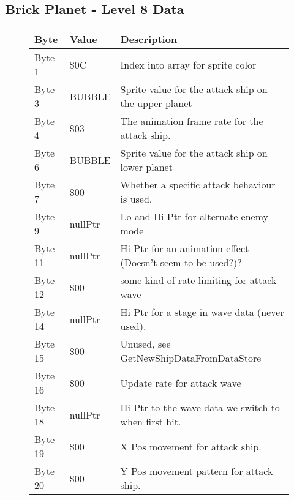 \clearpage
\subsection{Brick Planet - Level 8 Data}

\begin{figure}[H]
  {
  \setlength{\tabcolsep}{3.0pt}
  \setlength\cmidrulewidth{\heavyrulewidth} %
  \begin{adjustbox}{width=12cm}

\begin{tabular}{lll}
\toprule
 Byte    & Value            & Description                                                        \\
\midrule
 Byte 1  & \$0C              & Index into array for sprite color                                  \\
 Byte 3  & BUBBLE           & Sprite value for the attack ship on the upper planet               \\
 Byte 4  & \$03              & The animation frame rate for the attack ship.                      \\
 Byte 6  & BUBBLE           & Sprite value for the attack ship on lower planet                   \\
 Byte 7  & \$00              & Whether a specific attack behaviour is used.                       \\
 Byte 9  & nullPtr          & Lo and Hi Ptr for alternate enemy mode                             \\
 Byte 11 & nullPtr          & Hi Ptr for an animation effect (Doesn't seem to be used?)?         \\
 Byte 12 & \$00              & some kind of rate limiting for attack wave                         \\
 Byte 14 & nullPtr          & Hi Ptr for a stage in wave data (never used).                      \\
 Byte 15 & \$00              & Unused, see GetNewShipDataFromDataStore                            \\
 Byte 16 & \$00              & Update rate for attack wave                                        \\
 Byte 18 & nullPtr          & Hi Ptr to the wave data we switch to when first hit.               \\
 Byte 19 & \$00              & X Pos movement for attack ship.                                    \\
 Byte 20 & \$00              & Y Pos movement pattern for attack ship.                            \\

\end{tabular}
\end{adjustbox}}
\end{figure}

